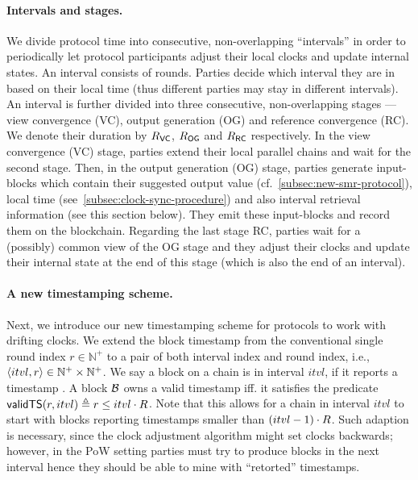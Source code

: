 \paragraph{Intervals and stages.}
%
We divide protocol time into consecutive, non-overlapping ``intervals'' in order to periodically let protocol participants adjust their local clocks and update internal states.
%
An interval consists of \syncLen rounds.
%
Parties decide which interval they are in based on their local time (thus different parties may stay in different intervals).
%
An interval is further divided into three consecutive, non-overlapping stages --- view convergence (\textsf{VC}), output generation (\textsf{OG}) and reference convergence (\textsf{RC}).
%
We denote their duration by $R_{\mathsf{VC}}$, $R_{\mathsf{OG}}$ and $R_{\mathsf{RC}}$ respectively.
%
In the view convergence (\textsf{VC}) stage, parties extend their local parallel chains and wait for the second stage.
%
Then, in the output generation (\textsf{OG}) stage, parties generate input-blocks which contain their suggested output value (cf.~\cref{subsec:new-smr-protocol}), local time (see~\cref{subsec:clock-sync-procedure}) and also interval retrieval information (see this section below).
%
They emit these input-blocks and record them on the blockchain.
%
Regarding the last stage \textsf{RC}, parties wait for a (possibly) common view of the \textsf{OG} stage and they adjust their clocks and update their internal state at the end of this stage (which is also the end of an interval).

\paragraph{A new timestamping scheme.}
%
Next, we introduce our new timestamping scheme for protocols to work with drifting clocks.
%
We extend the block timestamp from the conventional single round index $r \in  \mathbb{N}^+$ to a pair of both interval index and round index, i.e., $\langle itvl, r \rangle \in \mathbb{N}^+ \times \mathbb{N}^+$.
%
We say a block \block on a chain \chain is in interval $itvl$, if it reports a timestamp .
%
A block $\mathcal{B}$ owns a valid timestamp iff. it satisfies the predicate $\mathsf{validTS}(r, itvl) \triangleq r \le itvl \cdot R$.
%
Note that this allows for a chain in interval $itvl$ to start with blocks reporting timestamps smaller than $(itvl - 1)\cdot R$.
%
Such adaption is necessary, since the clock adjustment algorithm might set clocks backwards; however, in the PoW setting parties must try to produce blocks in the next interval hence they should be able to mine with ``retorted'' timestamps.

